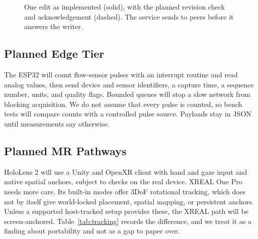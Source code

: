 \documentclass[conference]{IEEEtran}
\begin{document}
\begin{figure}[t]
\centering
{}
\caption{One edit as implemented (solid), with the planned revision check and acknowledgement (dashed). The service sends to peers before it answers the writer.}
\label{fig:sequence}
\end{figure}

\subsection{Planned Edge Tier}
The ESP32 will count flow-sensor pulses with an interrupt routine and read analog values, then send device and sensor identifiers, a capture time, a sequence number, units, and quality flags. Bounded queues will stop a slow network from blocking acquisition. We do not assume that every pulse is counted, so bench tests will compare counts with a controlled pulse source. Payloads stay in JSON until measurements say otherwise.

\subsection{Planned MR Pathways}
HoloLens 2 will use a Unity and OpenXR client with hand and gaze input and native spatial anchors, subject to checks on the real device. XREAL One Pro needs more care. Its built-in modes offer 3DoF rotational tracking, which does not by itself give world-locked placement, spatial mapping, or persistent anchors. Unless a supported host-tracked setup provides these, the XREAL path will be screen-anchored. Table~\ref{tab:tracking} records the difference, and we treat it as a finding about portability and not as a gap to paper over.
\end{document}
